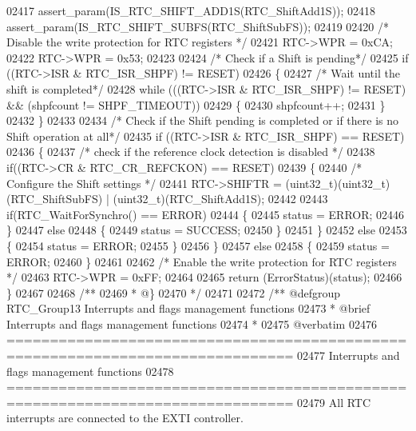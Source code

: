 \begin{DoxyCode}
02417   assert_param(IS\_RTC\_SHIFT\_ADD1S(RTC\_ShiftAdd1S));
02418   assert_param(IS\_RTC\_SHIFT\_SUBFS(RTC\_ShiftSubFS));
02419 
02420   \textcolor{comment}{/* Disable the write protection for RTC registers */}
02421   RTC->WPR = 0xCA;
02422   RTC->WPR = 0x53;
02423 
02424   \textcolor{comment}{/* Check if a Shift is pending*/}
02425   \textcolor{keywordflow}{if} ((RTC->ISR & RTC_ISR_SHPF) != RESET)
02426   \{
02427     \textcolor{comment}{/* Wait until the shift is completed*/}
02428     \textcolor{keywordflow}{while} (((RTC->ISR & RTC_ISR_SHPF) != RESET) && (shpfcount != 
      SHPF_TIMEOUT))
02429     \{
02430       shpfcount++;
02431     \}
02432   \}
02433 
02434   \textcolor{comment}{/* Check if the Shift pending is completed or if there is no Shift operation at all*/}
02435   \textcolor{keywordflow}{if} ((RTC->ISR & RTC_ISR_SHPF) == RESET)
02436   \{
02437     \textcolor{comment}{/* check if the reference clock detection is disabled */}
02438     \textcolor{keywordflow}{if}((RTC->CR & RTC_CR_REFCKON) == RESET)
02439     \{
02440       \textcolor{comment}{/* Configure the Shift settings */}
02441       RTC->SHIFTR = (uint32\_t)(uint32\_t)(RTC\_ShiftSubFS) | (uint32\_t)(RTC\_ShiftAdd1S);
02442 
02443       \textcolor{keywordflow}{if}(RTC\_WaitForSynchro() == ERROR)
02444       \{
02445         status = ERROR;
02446       \}
02447       \textcolor{keywordflow}{else}
02448       \{
02449         status = SUCCESS;
02450       \}
02451     \}
02452     \textcolor{keywordflow}{else}
02453     \{
02454       status = ERROR;
02455     \}
02456   \}
02457   \textcolor{keywordflow}{else}
02458   \{
02459     status = ERROR;
02460   \}
02461 
02462   \textcolor{comment}{/* Enable the write protection for RTC registers */}
02463   RTC->WPR = 0xFF;
02464 
02465   \textcolor{keywordflow}{return} (ErrorStatus)(status);
02466 \}
02467 
02468 \textcolor{comment}{/**}
02469 \textcolor{comment}{  * @\}}
02470 \textcolor{comment}{  */}
02471 
02472 \textcolor{comment}{/** @defgroup RTC\_Group13 Interrupts and flags management functions}
02473 \textcolor{comment}{ *  @brief   Interrupts and flags management functions  }
02474 \textcolor{comment}{ *}
02475 \textcolor{comment}{@verbatim   }
02476 \textcolor{comment}{ ===============================================================================}
02477 \textcolor{comment}{                       Interrupts and flags management functions}
02478 \textcolor{comment}{ ===============================================================================  }
02479 \textcolor{comment}{ All RTC interrupts are connected to the EXTI controller.}

\end{DoxyCode}

